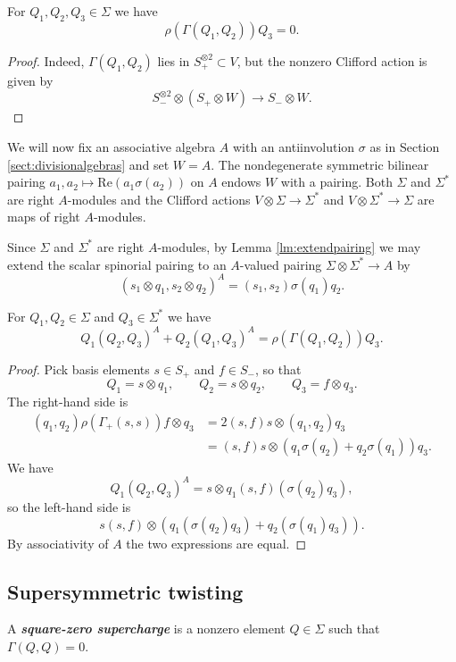 \documentclass[10pt, oneside]{article}
\renewcommand{\Re}{\mathrm{Re}}
\newcommand{\defterm}[1]{\textbf{\emph{#1}}}
\begin{document}
\begin{thm}
For $Q_1, Q_2, Q_3\in\Sigma$ we have
\[\rho(\Gamma(Q_1, Q_2))Q_3 = 0.\]
\label{thm:2d3psi}
\end{thm}
\begin{proof}
Indeed, $\Gamma(Q_1, Q_2)$ lies in $S_+^{\otimes 2}\subset V$, but the nonzero Clifford action is given by
\[S_-^{\otimes 2}\otimes (S_+\otimes W)\longrightarrow S_-\otimes W.\]
\end{proof}

We will now fix an associative algebra $A$ with an antiinvolution $\sigma$ as in Section \ref{sect:divisionalgebras} and set $W = A$. The nondegenerate symmetric bilinear pairing $a_1, a_2\mapsto \Re(a_1\sigma(a_2))$ on $A$ endows $W$ with a pairing. Both $\Sigma$ and $\Sigma^*$ are right $A$-modules and the Clifford actions $V\otimes \Sigma\rightarrow \Sigma^*$ and $V\otimes \Sigma^*\rightarrow \Sigma$ are maps of right $A$-modules.

Since $\Sigma$ and $\Sigma^*$ are right $A$-modules, by Lemma \ref{lm:extendpairing} we may extend the scalar spinorial pairing to an $A$-valued pairing $\Sigma\otimes \Sigma^*\rightarrow A$ by
\[(s_1\otimes q_1, s_2\otimes q_2)^A = (s_1, s_2)\sigma(q_1) q_2.\]

\begin{thm}
For $Q_1, Q_2\in\Sigma$ and $Q_3\in\Sigma^*$ we have
\[Q_1(Q_2, Q_3)^A + Q_2(Q_1, Q_3)^A = \rho(\Gamma(Q_1, Q_2))Q_3.\]
\label{thm:2dmatter3psi}
\end{thm}
\begin{proof}
Pick basis elements $s\in S_+$ and $f\in S_-$, so that
\[Q_1 = s\otimes q_1,\qquad Q_2 = s\otimes q_2,\qquad Q_3 = f\otimes q_3.\]
The right-hand side is
\begin{align*}
(q_1, q_2) \rho(\Gamma_+(s, s)) f\otimes q_3 &= 2(s, f) s\otimes (q_1, q_2) q_3 \\
&= (s, f) s\otimes (q_1\sigma(q_2) + q_2\sigma(q_1)) q_3.
\end{align*}
We have
\[Q_1(Q_2, Q_3)^A = s\otimes q_1 (s, f) (\sigma(q_2)q_3),\]
so the left-hand side is
\[s(s, f)\otimes (q_1(\sigma(q_2) q_3) + q_2(\sigma(q_1)q_3)).\]
By associativity of $A$ the two expressions are equal.
\end{proof}

\subsection{Supersymmetric twisting}

\begin{definition}
A \defterm{square-zero supercharge} is a nonzero element $Q\in\Sigma$ such that $\Gamma(Q, Q)=0$.
\end{definition}
\end{document}

